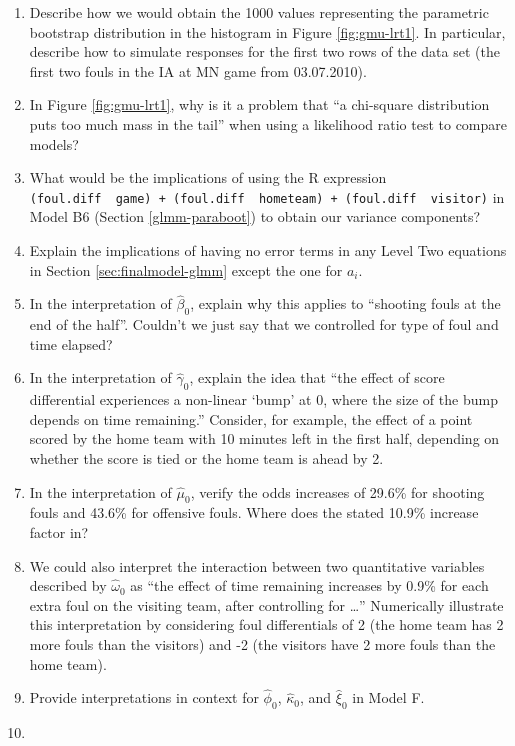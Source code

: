 \documentclass[
]{krantz}
\begin{document}
\begin{enumerate}
\item
  Describe how we would obtain the 1000 values representing the parametric bootstrap distribution in the histogram in Figure \ref{fig:gmu-lrt1}. In particular, describe how to simulate responses for the first two rows of the data set (the first two fouls in the IA at MN game from 03.07.2010).
\item
  In Figure \ref{fig:gmu-lrt1}, why is it a problem that ``a chi-square distribution puts too much mass in the tail'' when using a likelihood ratio test to compare models?
\item
  What would be the implications of using the R expression \texttt{(foul.diff\ \textbar{}\ game)\ +\ (foul.diff\ \textbar{}\ hometeam)\ +\ (foul.diff\ \textbar{}\ visitor)} in Model B6 (Section \ref{glmm-paraboot}) to obtain our variance components?
\item
  Explain the implications of having no error terms in any Level Two equations in Section \ref{sec:finalmodel-glmm} except the one for \(a_{i}\).
\item
  In the interpretation of \(\hat{\beta}_{0}\), explain why this applies to ``shooting fouls at the end of the half''. Couldn't we just say that we controlled for type of foul and time elapsed?
\item
  In the interpretation of \(\hat{\gamma}_{0}\), explain the idea that ``the effect of score differential experiences a non-linear `bump' at 0, where the size of the bump depends on time remaining.'' Consider, for example, the effect of a point scored by the home team with 10 minutes left in the first half, depending on whether the score is tied or the home team is ahead by 2.
\item
  In the interpretation of \(\hat{\mu}_{0}\), verify the odds increases of 29.6\% for shooting fouls and 43.6\% for offensive fouls. Where does the stated 10.9\% increase factor in?
\item
  We could also interpret the interaction between two quantitative variables described by \(\hat{\omega}_{0}\) as ``the effect of time remaining increases by 0.9\% for each extra foul on the visiting team, after controlling for \ldots{}'' Numerically illustrate this interpretation by considering foul differentials of 2 (the home team has 2 more fouls than the visitors) and -2 (the visitors have 2 more fouls than the home team).
\item
  Provide interpretations in context for \(\hat{\phi}_{0}\), \(\hat{\kappa}_{0}\), and \(\hat{\xi}_{0}\) in Model F.
\item

\end{enumerate}
\end{document}

